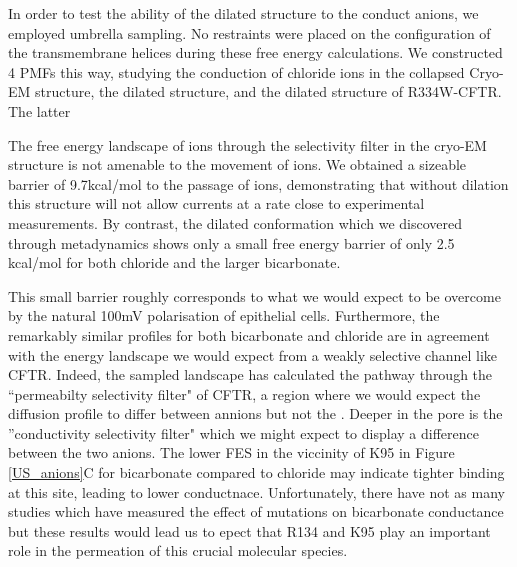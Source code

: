 In order to test the ability of the dilated structure to the conduct anions, we employed umbrella sampling. No restraints were placed on the configuration of the transmembrane helices during these free energy calculations. We constructed 4 PMFs this way, studying the conduction of chloride ions in the collapsed Cryo-EM structure, the dilated structure, and the dilated structure of R334W-CFTR. The latter 

The free energy landscape of ions through the selectivity filter in the cryo-EM structure is not amenable to the movement of ions. We obtained a sizeable barrier of 9.7kcal/mol to the passage of ions, demonstrating that without dilation this structure will not allow currents at a rate close to experimental measurements. By contrast, the dilated conformation which we discovered through metadynamics shows only a small free energy barrier of only 2.5 kcal/mol for both chloride and the larger bicarbonate. 

This small barrier roughly corresponds to what we would expect to be overcome by the natural 100mV polarisation of epithelial cells. Furthermore, the remarkably similar profiles for both bicarbonate and chloride are in agreement with the energy landscape we would expect from a weakly selective channel like CFTR. Indeed, the sampled landscape has calculated the pathway through the ``permeabilty selectivity filter" of CFTR, a region where we would expect the diffusion profile to differ between annions but not the . Deeper in the pore is the ''conductivity selectivity filter" which we might expect to display a difference between the two anions. The lower FES in the viccinity of K95 in Figure \ref{US_anions}C for bicarbonate compared to chloride may indicate tighter binding at this site, leading to lower conductnace. Unfortunately, there have not as many studies which have measured the effect of mutations on bicarbonate conductance but these results would lead us to epect that R134 and K95 play an important role in the permeation of this crucial molecular species. 

